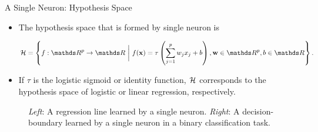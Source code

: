 \documentclass[11pt,compress,t,notes=noshow, xcolor=table]{beamer}
\begin{document}

\begin{vbframe}{A Single Neuron: Hypothesis Space}
\begin{itemize}
\item The hypothesis space that is formed by single neuron %
is 
\begin{small}
$$\Hspace  = \left\{f: \R^p \to \R ~\bigg|~ \fx = \tau\left(\sum_{j = 1}^p w_j x_j + b\right), \wtw \in \R^p, b \in \R\right\}.$$ 
\end{small}
\item If $\tau$ is the logistic sigmoid or identity function, $\mathcal{H}$ corresponds to the hypothesis space of logistic or linear regression, respectively.
\end{itemize}
\vspace*{-0.45cm}
\begin{figure}
\centering
{}
\vspace*{-0.2cm}
\begin{tiny}
\caption{\textit{Left}: A regression line learned by a single neuron. \textit{Right}: A decision-boundary learned by a single neuron in a binary classification task.}
\end{tiny}
\end{figure}
\end{vbframe}
\end{document}
